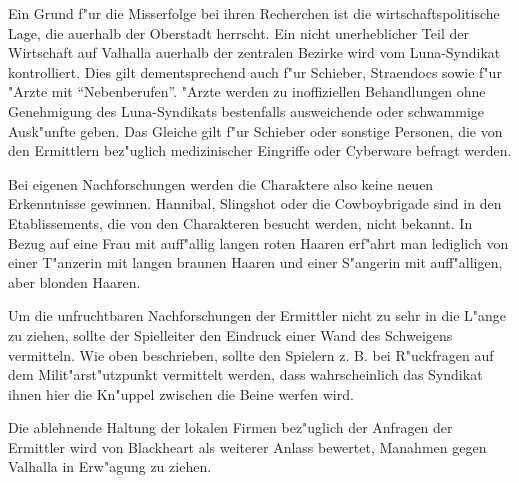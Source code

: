 Ein Grund f"ur die Misserfolge bei ihren Recherchen ist die wirtschaftspolitische Lage, die au\3erhalb der Oberstadt herrscht. Ein nicht unerheblicher Teil der Wirtschaft auf Valhalla au\3erhalb der zentralen Bezirke wird vom Luna-Syndikat kontrolliert. Dies gilt dementsprechend auch f"ur Schieber, Stra\3endocs sowie f"ur "Arzte mit "`Nebenberufen"'. "Arzte werden zu inoffiziellen Behandlungen ohne Genehmigung des Luna-Syndikats bestenfalls ausweichende oder schwammige Ausk"unfte geben. Das Gleiche gilt f"ur Schieber oder sonstige Personen, die von den Ermittlern bez"uglich medizinischer Eingriffe oder Cyberware befragt werden.

Bei eigenen Nachforschungen werden die Charaktere also keine neuen Erkenntnisse gewinnen. Hannibal, Slingshot oder die Cowboybrigade sind in den Etablissements, die von den Charakteren besucht werden, nicht bekannt. In Bezug auf eine Frau mit auff"allig langen roten Haaren erf"ahrt man lediglich von einer T"anzerin mit langen braunen Haaren und einer S"angerin mit auff"alligen, aber blonden Haaren.

\begin{remarks}
	Um die unfruchtbaren Nachforschungen der Ermittler nicht zu sehr in die L"ange zu ziehen, sollte der Spielleiter den Eindruck einer Wand des Schweigens vermitteln. Wie oben beschrieben, sollte den Spielern z. B. bei R"uckfragen auf dem Milit"arst"utzpunkt vermittelt werden, dass wahrscheinlich das Syndikat ihnen hier die Kn"uppel zwischen die Beine werfen wird.

	Die ablehnende Haltung der lokalen Firmen bez"uglich der Anfragen der Ermittler wird von Blackheart als weiterer Anlass bewertet, Ma\3nahmen gegen Valhalla in Erw"agung zu ziehen.
\end{remarks}
